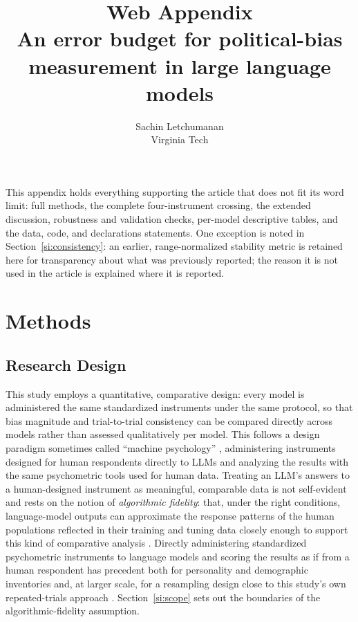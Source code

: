 \documentclass[11pt]{article}
\title{\textbf{Web Appendix\\
An error budget for political-bias measurement in large language models}}
\author{Sachin Letchumanan \\ Virginia Tech}
\date{}
\begin{document}
\maketitle
\renewcommand{\thesection}{S\arabic{section}}
\renewcommand{\thetable}{S\arabic{table}}
\renewcommand{\thefigure}{S\arabic{figure}}
\setcounter{section}{0}\setcounter{table}{0}\setcounter{figure}{0}

\noindent This appendix holds everything supporting the article that does not
fit its word limit: full methods, the complete four-instrument crossing, the
extended discussion, robustness and validation checks, per-model descriptive
tables, and the data, code, and declarations statements. One exception is
noted in Section~\ref{si:consistency}: an earlier, range-normalized stability
metric is retained here for transparency about what was previously reported;
the reason it is not used in the article is explained where it is reported.

\section{Methods}
\label{si:methods}

\subsection{Research Design}

This study employs a quantitative, comparative design: every model is
administered the same standardized instruments under the same protocol, so
that bias magnitude and trial-to-trial consistency can be compared directly
across models rather than assessed qualitatively per model. This follows a
design paradigm sometimes called ``machine psychology'' \citep{hagendorff2023},
administering instruments designed for human respondents directly to LLMs and
analyzing the results with the same psychometric tools used for human data.
Treating an LLM's answers to a human-designed instrument as meaningful,
comparable data is not self-evident and rests on the notion of
\emph{algorithmic fidelity}: that, under the right conditions, language-model
outputs can approximate the response patterns of the human populations
reflected in their training and tuning data closely enough to support this
kind of comparative analysis \citep{argyle2023}. Directly administering
standardized psychometric instruments to language models and scoring the
results as if from a human respondent has precedent both for personality and
demographic inventories \citep{miotto2022} and, at larger scale, for a
resampling design close to this study's own repeated-trials approach
\citep{serapiogarcia2023}. Section~\ref{si:scope} sets out the boundaries of
the algorithmic-fidelity assumption.
\end{document}
